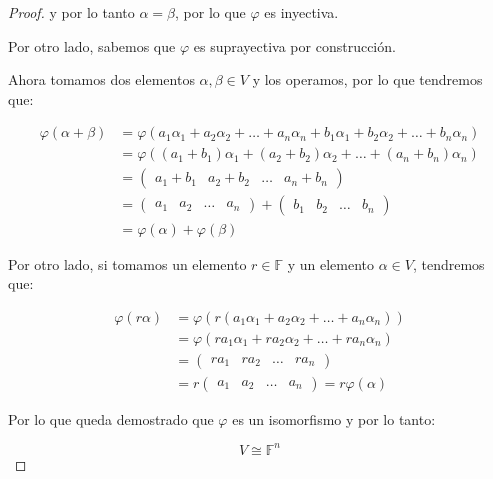 \begin{proof}
			y por lo tanto $\alpha = \beta$, por lo que $\varphi$ es inyectiva.

			Por otro lado, sabemos que $\varphi$ es suprayectiva por construcción.

			Ahora tomamos dos elementos $\alpha, \beta \in V$ y los operamos, por lo que tendremos que:

			\begin{align*}
				\varphi(\alpha + \beta) &= \varphi(a_1 \alpha_1 + a_2 \alpha_2 + \dots + a_n \alpha_n + b_1 \alpha_1 + b_2 \alpha_2 + \dots + b_n \alpha_n) \\
				&= \varphi((a_1 + b_1) \alpha_1 + (a_2 + b_2) \alpha_2 + \dots + (a_n + b_n) \alpha_n) \\
				&= \begin{pmatrix} a_1 + b_1 & a_2 + b_2 & \dots & a_n + b_n \end{pmatrix} \\
				&= \begin{pmatrix} a_1 & a_2 & \dots & a_n \end{pmatrix} + \begin{pmatrix} b_1 & b_2 & \dots & b_n \end{pmatrix} \\
				&= \varphi(\alpha) + \varphi(\beta)
			\end{align*}

			Por otro lado, si tomamos un elemento $r \in \mathbb{F}$ y un elemento $\alpha \in V$, tendremos que:

			\begin{align*}
				\varphi(r \alpha) &= \varphi(r (a_1 \alpha_1 + a_2 \alpha_2 + \dots + a_n \alpha_n)) \\
				&= \varphi(r a_1 \alpha_1 + r a_2 \alpha_2 + \dots + r a_n \alpha_n) \\
				&= \begin{pmatrix} r a_1 & r a_2 & \dots & r a_n \end{pmatrix} \\
				&= r \begin{pmatrix} a_1 & a_2 & \dots & a_n \end{pmatrix} = r \varphi(\alpha)
			\end{align*}

			Por lo que queda demostrado que $\varphi$ es un isomorfismo y por lo tanto:

			\begin{equation*}
				V \cong \mathbb{F}^n
			\end{equation*}
		\end{proof}

